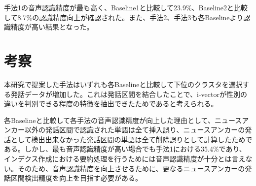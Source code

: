 手法1の音声認識精度が最も高く、Baseline1と比較して23.9\%、Baseline2と比較して8.7\%の認識精度向上が確認された。また、手法2、手法3も各Baselineより認識精度が高い結果となった。

\section{考察}
本研究で提案した手法はいずれも各Baselineと比較して下位のクラスタを選択する発話データが増加した。これは発話区間を結合したことで、i-vectorが性別の違いを判別できる程度の特徴を抽出できたためであると考えられる。\par
各Baselineと比較して各手法の音声認識精度が向上した理由として、ニュースアンカー以外の発話区間で認識された単語は全て挿入誤り、ニュースアンカーの発話として検出出来なかった発話区間の単語は全て削除誤りとして計算したためである。しかし、最も音声認識精度が高い場合でも手法1における35.4\%であり、インデクス作成における要約処理を行うためには音声認識精度が十分とは言えない。そのため、音声認識精度を向上させるために、更なるニュースアンカーの発話区間検出精度を向上を目指す必要がある。

